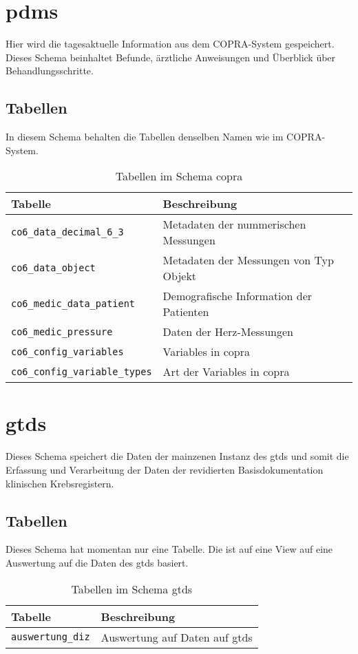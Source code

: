   \section{\ac{pdms}}
  Hier wird die tagesaktuelle Information aus dem COPRA-System gespeichert. Dieses Schema beinhaltet Befunde, ärztliche Anweisungen und Überblick über Behandlungsschritte.
  \subsection{Tabellen}
  In diesem Schema behalten die Tabellen denselben Namen wie im COPRA-System. 
  \begin{table}[ht]
  	\centering   
  	\caption{Tabellen im Schema copra}
  	\begin{tabular}{||l|l||}   		
  		\hline
  		Tabelle & Beschreibung \\ [0.5ex]
  		\hline\hline
  		\texttt{co6\_data\_decimal\_6\_3} & Metadaten der nummerischen Messungen \\
  		\hline
  		\texttt{co6\_data\_object} & Metadaten der Messungen von Typ Objekt\\
  		\hline
  		\texttt{co6\_medic\_data\_patient} & Demografische Information der Patienten \\
  		\hline
  		\texttt{co6\_medic\_pressure} & Daten der Herz-Messungen\\
  		\hline
  		\texttt{co6\_config\_variables} & Variables in copra\\ \hline
  		\texttt{co6\_config\_variable\_types} & Art der Variables in copra\\ \hline
  	\end{tabular}
  \end{table}

  \section{gtds} 
  Dieses Schema speichert die Daten der mainzenen Instanz des \ac{gtds} und somit die Erfassung und Verarbeitung der Daten der revidierten Basisdokumentation klinischen Krebsregistern.
  \subsection{Tabellen}
  Dieses Schema hat momentan nur eine Tabelle. Die ist auf eine View auf eine Auswertung auf die Daten des \ac{gtds} basiert.
  \begin{table}[ht]
  	\centering   
  	\caption{Tabellen im Schema gtds}
  	\begin{tabular}{||l|l||}   		
  		\hline
  		Tabelle & Beschreibung \\ [0.5ex]
  		\hline\hline
  		\texttt{auswertung\_diz} & Auswertung auf Daten auf \ac{gtds} \\
  		\hline
  	\end{tabular}
  \end{table}
